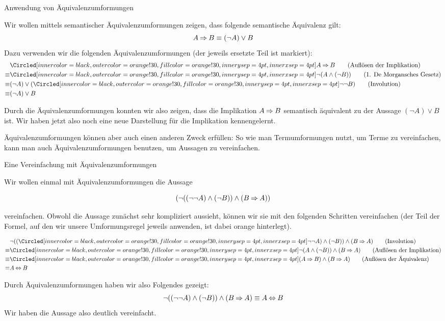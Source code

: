 \documentclass[../../main.tex]{subfiles}
\begin{document}
    \begin{example}{Anwendung von Äquivalenzumformungen}{
            Wir wollen mittels semantischer Äquivalenzumformungen zeigen, dass 
            folgende semantische Äquivalenz gilt:
            \[A \mathbin{\Rightarrow} B \equiv (\lnot A) \lor B\]
            Dazu verwenden wir die folgenden Äquivalenzumformungen (der jeweils ersetzte Teil ist markiert):
            \begin{align*}
                & \circlemath{A \limplies B}\tag{Auflösen der Implikation}\\
                \equiv & \circlemath{\lnot (A \land (\lnot B))}\tag{1. De Morgansches Gesetz}\\
                \equiv & (\lnot A) \lor (\circlemath{\lnot \lnot B})\tag{Involution}\\
                \equiv & (\lnot A) \lor B
            \end{align*}

            Durch die Äquivalenzumformungen konnten wir also zeigen, dass die Implikation $A \mathbin{\Rightarrow} B$
            semantisch äquivalent zu der Aussage $(\lnot A) \lor B$ ist. Wir haben
            jetzt also noch eine neue Darstellung für die Implikation kennengelernt. 

    } \end{example}

    Äquivalenzumformungen können aber auch einen anderen Zweck erfüllen: So wie man Termumformungen
    nutzt, um Terme zu vereinfachen, kann man auch Äquivalenzumformungen benutzen, um Aussagen
    zu vereinfachen.

    \begin{example}{Eine Vereinfachung mit Äquivalenzumformungen}

        Wir wollen einmal mit Äquivalenzumformungen die Aussage 

        \[ (\lnot ( (\lnot \lnot A)\land (\lnot B) ) \land (B \mathbin{\Rightarrow} A))\]

        vereinfachen. Obwohl die Aussage zunächst sehr kompliziert aussieht, können wir sie mit den folgenden Schritten vereinfachen (der Teil der Formel, auf den wir unsere Umformungsregel jeweils anwenden, ist dabei orange hinterlegt).

        \begin{align*}
            & \lnot ( (\circlemath{\lnot \lnot A}) \land (\lnot B) ) \land (B \limplies A) \tag{Involution}\\
            \equiv & \circlemath{\lnot ( A\land (\lnot B) )} \land (B \limplies A) \tag{Auflösen der Implikation}\\
            \equiv & \circlemath{(A \limplies B) \land (B \limplies A)} \tag{Auflösen der Äquivalenz}\\
            \equiv & A \liff B
        \end{align*}

        Durch Äquivalenzumformungen haben wir also Folgendes gezeigt:
        \[\lnot ( (\lnot \lnot A)\land (\lnot B) ) \land (B \mathbin{\Rightarrow} A) \equiv A \mathbin{\Leftrightarrow} B\]
        Wir haben die Aussage also deutlich vereinfacht.

    \end{example}
\end{document}
